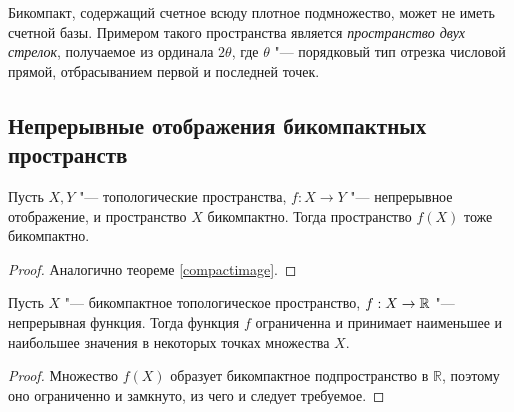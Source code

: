 \begin{note}
    Бикомпакт, содержащий счетное всюду плотное подмножество, может не иметь счетной базы. Примером такого пространства является \textit{пространство двух стрелок}, получаемое из ординала $2\theta$, где $\theta$ "--- порядковый тип отрезка числовой прямой, отбрасыванием первой и последней точек.
\end{note}

\subsection{Непрерывные отображения бикомпактных пространств}

\begin{theorem}
	Пусть $X, Y$ "--- топологические пространства, $f : X \to Y$ "--- непрерывное отображение, и пространство $X$ бикомпактно. Тогда пространство $f(X)$ тоже бикомпактно.
\end{theorem}

\begin{proof}
    Аналогично теореме \ref{compactimage}.
\end{proof}

\begin{theorem}[Вейерштрасса]
    Пусть $X$ "--- бикомпактное топологическое пространство, $f : X \to \mathbb{R}$ "--- непрерывная функция. Тогда функция $f$ ограниченна и принимает наименьшее и наибольшее значения в некоторых точках множества $X$.
\end{theorem}

\begin{proof}
    Множество $f(X)$ образует бикомпактное подпространство в $\mathbb R$, поэтому оно ограниченно и замкнуто, из чего и следует требуемое.
\end{proof}